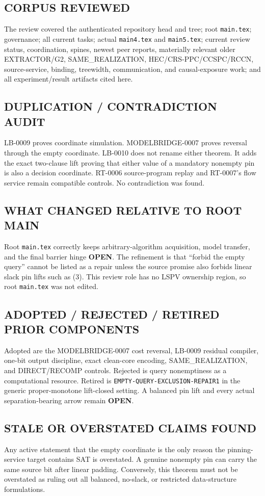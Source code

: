 \documentclass[11pt]{article}
\newcommand{\OPEN}{\textbf{OPEN}}
\begin{document}
\subsection*{CORPUS REVIEWED}
The review covered the authenticated repository head and tree; root
\texttt{main.tex}; governance; all current tasks; actual \texttt{main4.tex}
and \texttt{main5.tex}; current review status, coordination, spines, newest
peer reports, materially relevant older EXTRACTOR/G2, SAME\_REALIZATION,
HEC/CRS-PPC/CCSPC/RCCN, source-service, binding, treewidth, communication,
and causal-exposure work; and all experiment/result artifacts cited here.

\subsection*{DUPLICATION / CONTRADICTION AUDIT}
LB-0009 proves coordinate simulation.  MODELBRIDGE-0007 proves reversal
through the empty coordinate.  LB-0010 does not rename either theorem.  It
adds the exact two-clause lift proving that either value of a mandatory
nonempty pin is also a decision coordinate.  RT-0006 source-program replay
and RT-0007's flow service remain compatible controls.  No contradiction was
found.

\subsection*{WHAT CHANGED RELATIVE TO ROOT MAIN}
Root \texttt{main.tex} correctly keeps arbitrary-algorithm acquisition,
model transfer, and the final barrier hinge \OPEN.  The refinement is that
``forbid the empty query'' cannot be listed as a repair unless the source
promise also forbids linear slack pin lifts such as (3).  This review role has
no LSPV ownership region, so root \texttt{main.tex} was not edited.

\subsection*{ADOPTED / REJECTED / RETIRED PRIOR COMPONENTS}
Adopted are the MODELBRIDGE-0007 cost reversal, LB-0009 residual compiler,
one-bit output discipline, exact clean-core encoding, SAME\_REALIZATION, and
DIRECT/RECOMP controls.  Rejected is query nonemptiness as a computational
resource.  Retired is \texttt{EMPTY-QUERY-EXCLUSION-REPAIR1} in the generic
proper-monotone lift-closed setting.  A balanced pin lift and every actual
separation-bearing arrow remain \OPEN.

\subsection*{STALE OR OVERSTATED CLAIMS FOUND}
Any active statement that the empty coordinate is the only reason the
pinning-service target contains SAT is overstated.  A genuine nonempty pin
can carry the same source bit after linear padding.  Conversely, this theorem
must not be overstated as ruling out all balanced, no-slack, or restricted
data-structure formulations.
\end{document}

